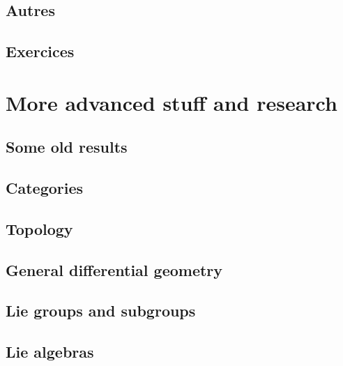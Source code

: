 \chapter{Autres}


\chapter{Exercices}




\part{More advanced stuff and research}



\chapter{Some old results}


\chapter{Categories}        \label{chap_category}


\chapter{Topology}              \label{chap_topology}



\chapter{General differential geometry} \label{Chapitre_FB}


\chapter{Lie groups and subgroups}


\chapter{Lie algebras}
  
 





